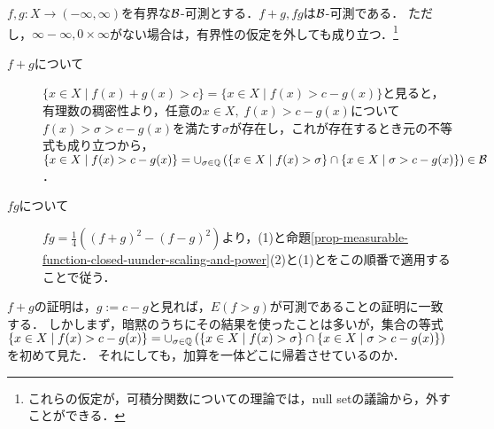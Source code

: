 \documentclass[uplatex, dvipdfmx]{jsreport}
\begin{document}
\begin{proposition}[和と積]\label{prop-sum-and-product-of-measurable-functions}
    $f,g:X\to(-\infty,\infty)$を有界な$\mathcal{B}$-可測とする．$f+g,fg$は$\mathcal{B}$-可測である．
    ただし，$\infty-\infty,0\times\infty$がない場合は，有界性の仮定を外しても成り立つ．\footnote{これらの仮定が，可積分関数についての理論では，null setの議論から，外すことができる．}
\end{proposition}
\begin{Proof}\mbox{}
    \begin{description}
        \item[$f+g$について] $\{x\in X\mid f(x)+g(x)>c\}=\{x\in X\mid f(x)>c-g(x)\}$と見ると，有理数の稠密性より，任意の$x\in X,\;f(x)>c-g(x)$について$f(x)>\sigma>c-g(x)$を満たす$\sigma$が存在し，これが存在するとき元の不等式も成り立つから，$\{x\in X\mid f(x)>c-g(x)\}=\cup_{\sigma\in\mathbb{Q}}\left(\{x\in X\mid f(x)>\sigma\}\cap\{x\in X\mid\sigma>c-g(x)\}\right)\in\mathcal{B}$．
        \item[$fg$について] $fg=\frac{1}{4}((f+g)^2-(f-g)^2)$より，(1)と命題\ref{prop-measurable-function-closed-uunder-scaling-and-power}(2)と(1)とをこの順番で適用することで従う．
    \end{description}
\end{Proof}
\begin{remarks}[可測関数で挟んだ領域の逆像も可算]
    $f+g$の証明は，$g:=c-g$と見れば，$E(f>g)$が可測であることの証明に一致する．
    しかしまず，暗黙のうちにその結果を使ったことは多いが，集合の等式$\{x\in X\mid f(x)>c-g(x)\}=\cup_{\sigma\in\mathbb{Q}}\left(\{x\in X\mid f(x)>\sigma\}\cap\{x\in X\mid\sigma>c-g(x)\}\right)$を初めて見た．
    それにしても，加算を一体どこに帰着させているのか．
\end{remarks}
\end{document}
